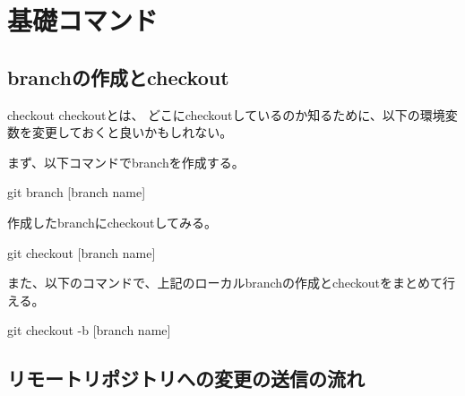 \documentclass[10pt,a4j,openany,dvipdfmx]{jsarticle}
\begin{document}
\section{基礎コマンド} %
\label{sec:基礎コマンド}


\subsection{branchの作成とcheckout} %
\label{sub:branchの作成とcheckout}

\begin{redbox}{checkout}
checkoutとは、
\tcblower
どこにcheckoutしているのか知るために、以下の環境変数を変更しておくと良いかもしれない。
\end{redbox}

まず、以下コマンドでbranchを作成する。
\begin{commandshell}
git branch [branch name]
\end{commandshell}

作成したbranchにcheckoutしてみる。
\begin{commandshell}
git checkout [branch name]
\end{commandshell}


また、以下のコマンドで、上記のローカルbranchの作成とcheckoutをまとめて行える。
\begin{commandshell}
git checkout -b [branch name]
\end{commandshell}

\subsection{リモートリポジトリへの変更の送信の流れ} %
\label{sub:リモートリポジトリへの変更の送信の流れ}
\end{document}
